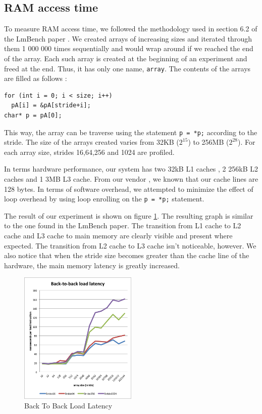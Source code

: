 \subsection{RAM access time}

To measure RAM access time, we followed the methodology used in section 6.2 of the LmBench paper \cite{lmbench}. We created arrays of increasing sizes and iterated through them 1 000 000 times sequentially and would wrap around if we reached the end of the array. Each such array is created at the beginning of an experiment and freed at the end. Thus, it has only one name, \texttt{array}. The contents of the arrays are filled as follows :

\begin{lstlisting}
for (int i = 0; i < size; i++)
  pA[i] = &pA[stride+i];
char* p = pA[0];
\end{lstlisting}

This way, the array can be traverse using the statement \texttt{p = *p;} according to the stride. The size of the arrays created varies from 32KB ($2^{15}$) to 256MB ($2^{28}$). For each array size, strides 16,64,256 and 1024 are profiled. 

In terms hardware performance, our system has two 32kB L1 caches , 2 256kB L2 caches and 1 3MB L3 cache. From our vendor \cite{vendor}, we known that our cache lines are 128 bytes. In terms of software overhead, we attempted to minimize the effect of loop overhead by using loop enrolling on the \texttt{p = *p;} statement.

The result of our experiment is shown on figure \ref{fig:b2blatency}. The resulting graph is similar to the one found in the LmBench paper. The transition from L1 cache to L2 cache and L3 cache to main memory are clearly visible and present where expected. The transition from L2 cache to L3 cache isn't noticeable, however. We also notice that when the stride size becomes greater than the cache line of the hardware, the main memory latency is greatly increased.

\begin{figure}
 \centering
  \includegraphics[width=0.5\textwidth]{image/backtobackload.png}
  \caption{Back To Back Load Latency}
 \label{fig:b2blatency}
\end{figure}

